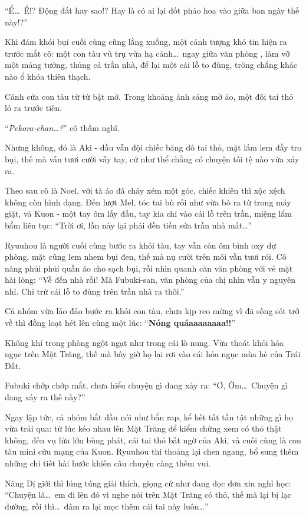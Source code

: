 \documentclass[../main.tex]{subfiles}
\begin{document}
``Ể\dots\ Ể!? Động đất hay sao!? Hay là có ai lại đốt pháo hoa vào giữa ban ngày thế này!?''

Khi đám khói bụi cuối cùng cũng lắng xuống, một cảnh tượng khó tin hiện ra trước mắt cô: một con tàu vũ trụ vừa hạ cánh\dots\ ngay giữa văn phòng \hll, làm vỡ một mảng tường, thủng cả trần nhà, để lại một cái lỗ to đùng, trông chẳng khác nào ổ khóa thiên thạch.

Cánh cửa con tàu từ từ bật mở. Trong khoảng ánh sáng mờ ảo, một đôi tai thỏ ló ra trước tiên.

``\textit{Pekora-chan\dots?}'' cô thầm nghĩ.

Nhưng không, đó là Aki - đầu vẫn đội chiếc băng đô tai thỏ, mặt lấm lem đầy tro bụi, thế mà vẫn tươi cười vẫy tay, cứ như thể chẳng có chuyện tồi tệ nào vừa xảy ra.

Theo sau cô là Noel, với tà áo đã cháy xém một góc, chiếc khiên thì xộc xệch không còn hình dạng. Đến lượt Mel, tóc tai bù rối như vừa bò ra từ trong máy giặt, và Kuon - một tay ôm lấy đầu, tay kia chỉ vào cái lỗ trên trần, miệng lẩm bẩm liên tục: ``Trời ơi, lần này lại phải đền tiền sửa trần nhà mất\dots''

Ryuuhou là người cuối cùng bước ra khỏi tàu, tay vẫn còn ôm bình oxy dự phòng, mặt cũng lem nhem bụi đen, thế mà nụ cười trên môi vẫn tươi rói. Cô nàng phủi phủi quần áo cho sạch bụi, rồi nhìn quanh căn văn phòng với vẻ mặt hài lòng: ``Về đến nhà rồi! Mà Fubuki-san, văn phòng của chị nhìn vẫn y nguyên nhỉ. Chỉ trừ cái lỗ to đùng trên trần nhà ra thôi.''

Cả nhóm vừa lảo đảo bước ra khỏi con tàu, chưa kịp reo mừng vì đã sống sót trở về thì đồng loạt hét lên cùng một lúc: ``\textbf{Nóng quáaaaaaaaa!!}''

Không khí trong phòng ngột ngạt như trong cái lò nung. Vừa thoát khỏi hỏa ngục trên Mặt Trăng, thế mà bây giờ họ lại rơi vào cái hỏa ngục mùa hè của Trái Đất.

Fubuki chớp chớp mắt, chưa hiểu chuyện gì đang xảy ra: ``Ơ, Ờm\dots\ Chuyện gì đang xảy ra thế này?''

Ngay lập tức, cả nhóm bắt đầu nói như bắn rap, kể hết tất tần tật những gì họ vừa trải qua: từ lúc kéo nhau lên Mặt Trăng để kiểm chứng xem có thỏ thật không, đến vụ lửa lớn bùng phát, cái tai thỏ bất ngờ của Aki, và cuối cùng là con tàu mini cứu mạng của Kuon. Ryuuhou thi thoảng lại chen ngang, bổ sung thêm những chi tiết hài hước khiến câu chuyện càng thêm vui.

Nàng Dị giới thì lúng túng giải thích, giọng cứ như đang đọc đơn xin nghỉ học: ``Chuyện là\dots\ em đi lên đó vì nghe nói trên Mặt Trăng có thỏ, thế mà lại bị lạc đường, rồi thì\dots\ đâm ra lại mọc thêm cái tai này luôn\dots''
\end{document}
